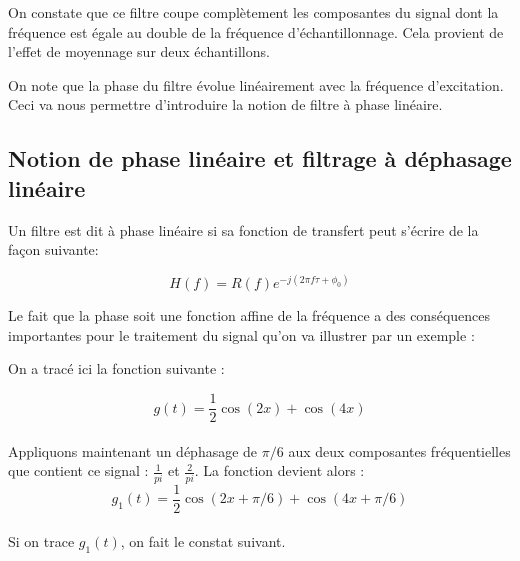 \documentclass[11pt,a4paper]{article}
\begin{document}
On constate que ce filtre coupe complètement les composantes du signal dont la fréquence est égale au double de la fréquence d'échantillonnage. Cela provient de l'effet de moyennage sur deux échantillons.

On note que la phase du filtre évolue linéairement avec la fréquence d'excitation. Ceci va nous permettre d'introduire la notion de filtre à phase linéaire.

\subsection{Notion de phase linéaire et filtrage à déphasage linéaire}
Un filtre est dit à phase linéaire si sa fonction de transfert peut s'écrire de la façon suivante: 

\[ H(f) = R(f)e^{-j(2\pi f \tau +\phi_0)} \]

Le fait que la phase soit une fonction affine de la fréquence a des conséquences importantes pour le traitement du signal qu'on va illustrer par un exemple :

\begin{center}
\end{center}

On a tracé ici la fonction suivante : 

\[ g(t) = \frac{1}{2} \cos(2 x) + \cos(4 x) \]\\

Appliquons maintenant un déphasage de $\pi/6$ aux  deux composantes fréquentielles que contient ce signal : $\frac{1}{pi}$  et $\frac{2}{pi}$. La fonction devient alors : \\

\[ g_1(t) = \frac{1}{2} \cos(2 x + \pi/6) + \cos(4 x +  \pi/6) \]\\

Si on trace $g_1(t)$, on fait le constat suivant.

\begin{center}
\end{center}
\end{document}

